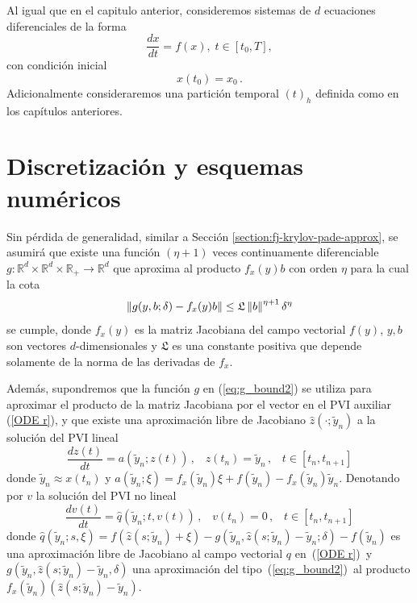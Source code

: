 Al igual que en el capitulo anterior, consideremos sistemas de $d$ ecuaciones diferenciales de la forma
\begin{equation}\label{syst-chap-fj}
	\frac{dx}{dt}=f(x), \; t\in[t_0,T],\end{equation}
con condición inicial
\begin{equation}\label{systcond-chap-fj}
	x(t_0)=x_0\,.
\end{equation}
Adicionalmente consideraremos una partición temporal $(t)_h$ definida como en los capítulos anteriores.

\section{Discretización y esquemas numéricos}

Sin pérdida de generalidad, similar a Sección \ref{section:fj-krylov-pade-approx}, se asumirá que existe una función $(\eta+1)$ veces continuamente diferenciable $g: \mathbb{R}^{d}\times \mathbb{R}^{d} \times \mathbb{R}_+ \to \mathbb{R}^{d}$ que aproxima al producto $f_x(y)b$ con orden $\eta$ para la cual la cota
\begin{equation} \label{eq:g_bound2}
	\left\lVert g(y,b;\delta)-f_x(y)b \right\rVert \leq \mathfrak{L}\left\lVert b \right\rVert^{\eta+1}\delta^{\eta}
\end{equation}
se cumple, donde $f_x(y)$ es la matriz Jacobiana del campo vectorial $f(y)$, $y,b$ son vectores $d$-dimensionales y $\mathfrak{L}$ es una constante positiva que depende solamente de la norma de las derivadas de $f_x$.

Además, supondremos que la función $g$ en (\ref{eq:g_bound2}) se utiliza para aproximar el producto de la matriz Jacobiana por el vector en el PVI auxiliar (\ref{ODE r}), y que existe una aproximación libre de Jacobiano $\widehat{z}(\cdotp ;\widetilde{y}_n)$ a la solución del PVI lineal
\begin{equation}
    \frac{dz(t)}{dt} = a(\widetilde{y}_n;z(t)) \,,\;\;\; z(t_n)=\widetilde{y}_n \,,\;\;\; t\in[t_n,t_{n+1}]\label{fjsyst0}
\end{equation}
donde $\widetilde{y}_n\approx x(t_n)$ y $a(\widetilde{y}_n;\xi) = f_x(\widetilde{y}_n)\xi+f(\widetilde{y}_n)-f_x(\widetilde{y}_n)\widetilde{y}_n$. Denotando por $v$ la solución del PVI no lineal
\begin{equation}
    \frac{dv(t)}{dt} = \widehat{q}(\widetilde{y}_n;t,v(t)) \,,\;\;\; v(t_n)=0 \,,\;\;\; t\in[t_n,t_{n+1}] \label{fjsyst}
\end{equation}
donde $\widehat{q}(\widetilde{y}_n;s,\xi)=f(\widehat{z}(s;\widetilde{y}_n)+\xi)-g(\widetilde{y}_n,\widehat{z}(s;\widetilde{y}_n)-\widetilde{y}_n;\delta)-f(\widetilde{y}_n)$ es una aproximación libre de Jacobiano al campo vectorial $q$ en~(\ref{ODE r})~y $g(\widetilde{y}_n,\widehat{z}(s;\widetilde{y}_n)-\widetilde{y}_n,\delta)$ una aproximación del tipo~(\ref{eq:g_bound2})~al producto $f_x(\widetilde{y}_n)(\widehat{z}(s;\widetilde{y}_n)-\widetilde{y}_n)$.

